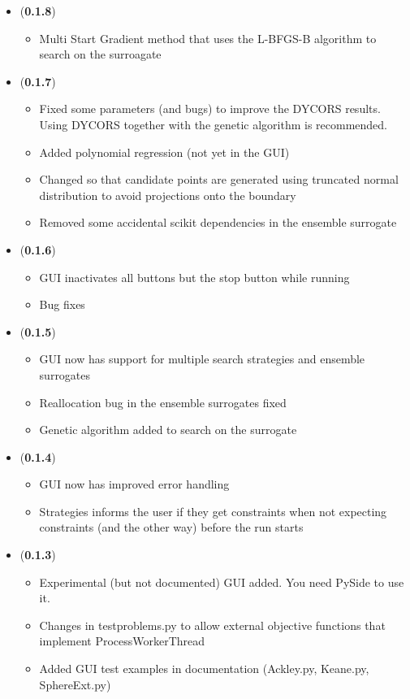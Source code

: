 \documentclass[]{article}
\begin{document}
\begin{itemize}
\item (\textbf{0.1.8}) 
\begin{itemize}
\item Multi Start Gradient method that uses the L-BFGS-B algorithm to search on the surroagate
\end{itemize}

\item (\textbf{0.1.7}) 
\begin{itemize}
\item Fixed some parameters (and bugs) to improve the DYCORS results. Using DYCORS together with the genetic algorithm is recommended.
\item Added polynomial regression (not yet in the GUI)
\item Changed so that candidate points are generated using truncated normal distribution to avoid projections onto the boundary
\item Removed some accidental scikit dependencies in the ensemble surrogate
\end{itemize}

\item (\textbf{0.1.6}) 
\begin{itemize}
\item GUI inactivates all buttons but the stop button while running
\item Bug fixes
\end{itemize}

\item (\textbf{0.1.5}) 
\begin{itemize}
\item GUI now has support for multiple search strategies and ensemble surrogates
\item Reallocation bug in the ensemble surrogates fixed
\item Genetic algorithm added to search on the surrogate
\end{itemize}

\item (\textbf{0.1.4}) 
\begin{itemize}
\item GUI now has improved error handling 
\item Strategies informs the user if they get constraints when not expecting constraints (and the other way) before the run starts
\end{itemize}

\item (\textbf{0.1.3}) 
\begin{itemize}
\item Experimental (but not documented) GUI added. You need PySide to use it.
\item Changes in testproblems.py to allow external objective functions that implement ProcessWorkerThread
\item Added GUI test examples in documentation (Ackley.py, Keane.py, SphereExt.py)
\end{itemize}


\end{itemize}
\end{document}
